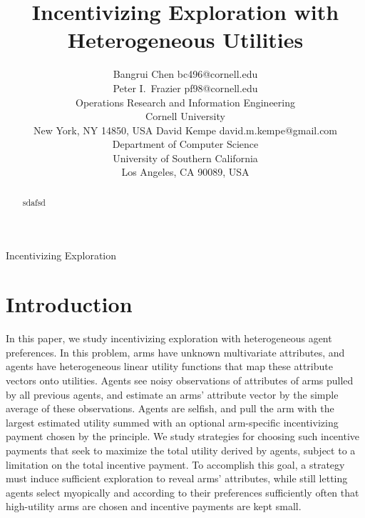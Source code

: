 \documentclass[twoside,11pt]{article}
\begin{document}
\title{Incentivizing Exploration with Heterogeneous Utilities}

\author{\name Bangrui Chen \email bc496@cornell.edu \\
\name Peter I.\ Frazier \email pf98@cornell.edu \\
\addr Operations Research and Information Engineering\\
Cornell University\\
New York, NY 14850, USA
\AND
\name David Kempe \email david.m.kempe@gmail.com  \\
\addr Department of Computer Science\\
University of Southern California\\
Los Angeles, CA 90089, USA}

\editor{}

\maketitle

\begin{abstract}
sdafsd
\end{abstract}

\begin{keywords}
Incentivizing Exploration
\end{keywords}

     

\section{Introduction}
In this paper, we study incentivizing exploration with heterogeneous agent preferences.
In this problem,   
arms have unknown multivariate attributes, and agents have heterogeneous linear utility functions that map these attribute vectors onto utilities. Agents see noisy observations of attributes of arms pulled by all previous agents, and estimate an arms' attribute vector by the simple average of these observations.  Agents are selfish, and pull the arm with the largest estimated utility summed with an optional arm-specific incentivizing payment chosen by the principle.
We study strategies for choosing such incentive payments that seek to maximize the total utility derived by agents, subject to a limitation on the total incentive payment.  To accomplish this goal, a strategy must induce sufficient exploration to reveal arms' attributes, while still letting agents select myopically and according to their preferences sufficiently often that high-utility arms are chosen and incentive payments are kept small.
\end{document}
